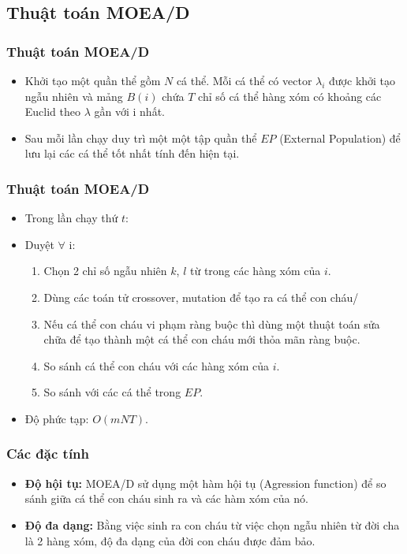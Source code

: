 \documentclass{beamer}
\begin{document}

\subsection{\textbf{Thuật toán MOEA/D}}

    \begin{frame}
    \frametitle{\textbf{Thuật toán MOEA/D}}
        \begin{itemize} 
            \item<1-> Khởi tạo một quần thể gồm $ N $ cá thể. Mỗi cá thể có vector $ \lambda_{i} $ được khởi tạo ngẫu nhiên và
                    mảng $ B(i) $ chứa $ T $ chỉ số cá thể hàng xóm có khoảng các Euclid theo $ \lambda $ gần với i nhất.
            \item<2-> Sau mỗi lần chạy duy trì một một tập quần thể $ EP $ (External Population) để lưu
                    lại các cá thể tốt nhất tính đến hiện tại.
        \end{itemize}
    \end{frame}

    \begin{frame}
    \frametitle{\textbf{Thuật toán MOEA/D}} 
        \begin{itemize}
            \item<1-> Trong lần chạy thứ $ t $:
            \item<2-> Duyệt $ \forall $ i:
            \begin{enumerate}
                \item<2-> Chọn 2 chỉ số ngẫu nhiên $ k $, $ l $ từ trong các hàng xóm của $ i $.
                \item<2-> Dùng các toán tử crossover, mutation để tạo ra cá thể con cháu/
                \item<2-> Nếu cá thể con cháu vi phạm ràng buộc thì dùng một thuật toán sửa chữa để tạo thành một
                cá thể con cháu mới thỏa mãn ràng buộc.
                \item<3-> So sánh cá thể con cháu với các hàng xóm của $ i $. 
                \item<3-> So sánh với các cá thể trong $ EP $.
            \end{enumerate}
            \item<4-> Độ phức tạp: $ O(mNT) $.
        \end{itemize}
    \end{frame}

    \begin{frame}
    \frametitle{\textbf{Các đặc tính}}
        \begin{itemize}
            \item<1-> \textbf{Độ hội tụ:} MOEA/D sử dụng một hàm hội tụ (Agression function)
            để so sánh giữa cá thể con cháu sinh ra và các hàm xóm của nó.
            \item<2-> \textbf{Độ đa dạng:} Bằng việc sinh ra con cháu từ việc chọn ngẫu
            nhiên từ đời cha là 2 hàng xóm, độ đa dạng của đời con cháu được đảm bảo.
        \end{itemize}
    \end{frame}
\end{document}
